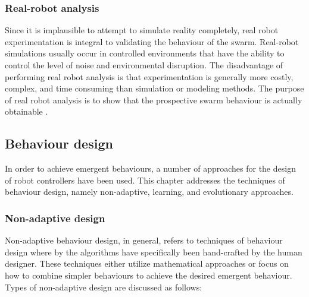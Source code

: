 \subsubsection{Real-robot analysis}

Since it is implausible to attempt to simulate reality completely, real robot experimentation is integral to validating the behaviour of the swarm. Real-robot simulations usually occur in controlled environments that have the ability to control the level of noise and environmental disruption. 
The disadvantage of performing real robot analysis is that experimentation is generally more costly, complex, and time consuming than simulation or modeling methods. The purpose of real robot analysis is to show that the prospective swarm behaviour is actually obtainable \cite{brambilla2013swarm}.

\subsection{Behaviour design}

In order to achieve emergent behaviours, a number of approaches for the design of robot controllers have been used. This chapter addresses the techniques of behaviour design, namely non-adaptive, learning, and evolutionary approaches.

\subsubsection{Non-adaptive design}
Non-adaptive behaviour design, in general, refers to techniques of behaviour design where by the algorithms have specifically been hand-crafted by the human designer. These techniques either utilize mathematical approaches or focus on how to combine simpler behaviours to achieve the desired emergent behaviour. Types of non-adaptive design are discussed as follows: 

